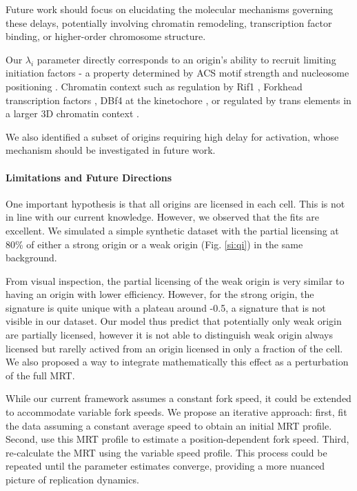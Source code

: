 \documentclass[10pt,a4paper]{revtex4-2}
\begin{document}
Future work should focus on elucidating the molecular mechanisms governing these delays, potentially involving chromatin remodeling, 
transcription factor binding, or higher-order chromosome structure.

Our $\lambda_i$ parameter directly corresponds to an origin's ability to recruit limiting initiation factors - a property determined by ACS motif strength and nucleosome positioning \cite{Marks2017,Foss2024}. Chromatin context such as regulation by Rif1 \cite{Peace2014,Theulot2025}, Forkhead transcription factors \cite{Knott2012}, DBf4 at the kinetochore \cite{Natsume2013}, or regulated by trans elements in a larger 3D chromatin context \cite{Knott2012}.

We also identified a subset of origins requiring high delay for activation, whose mechanism should be investigated in future work.

\paragraph{Limitations and Future Directions}

One important hypothesis is that all origins are licensed in each cell. This is not in line with our current knowledge. 
However, we observed that the fits are excellent. We simulated a simple synthetic dataset with the partial licensing at 80\% of 
either a strong origin or a weak origin (Fig. \ref{si:qi}) in the same background. 

From visual inspection, the partial licensing of the weak origin is very similar to having an origin with lower efficiency. 
However, for the strong origin, the signature is quite unique with a plateau around -0.5, a signature that is not visible in our dataset. 
Our  model thus predict that potentially only weak origin are partially licensed, however it is not able to distinguish weak origin always
licensed but rarelly actived from an origin licensed in only a fraction of the cell.
We also proposed a way to integrate mathematically this effect as a perturbation of the full MRT.

While our current framework assumes a constant fork speed, it could be extended to accommodate variable fork speeds. We propose an iterative approach: first, fit the data assuming a constant average speed to obtain an initial MRT profile. Second, use this MRT profile to estimate a position-dependent fork speed. Third, re-calculate the MRT using the variable speed profile. This process could be repeated until the parameter estimates converge, providing a more nuanced picture of replication dynamics.
\end{document}
